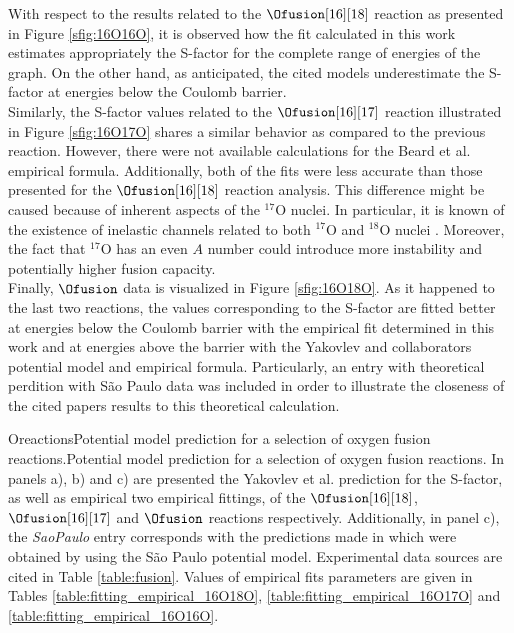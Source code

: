 \documentclass[openany]{book}
\begin{document}
With respect to the results related to the $\Ofusion[16][18]$ reaction as presented in Figure \ref{sfig:16O16O}, it is observed how the fit calculated in this work estimates appropriately the S-factor for the complete range of energies of the graph. On the other hand, as anticipated, the cited models underestimate the S-factor at energies below the Coulomb barrier. \\

Similarly, the S-factor values related to the $\Ofusion[16][17]$ reaction illustrated in Figure  \ref{sfig:16O17O} shares a similar behavior as compared to the previous reaction. However, there were not available calculations for the Beard et al. empirical formula. Additionally, both of the fits were less accurate than those presented for the $\Ofusion[16][18]$ reaction analysis. This difference might be caused because of inherent aspects of the $\mathrm{{}^{17}O}$ nuclei. In particular, it is known of the existence of inelastic channels related to both $\mathrm{{}^{17}O}$ and $\mathrm{{}^{18}O}$ nuclei \cite{kovar_geesaman_braid_eisen_henning_ophel_paul_rehm_sanders_sperr_et_1979}. Moreover, the fact that $\mathrm{{}^{17}O}$ has an even $A$ number could introduce more instability and potentially higher fusion capacity. \\

Finally,  $\Ofusion$ data is visualized in Figure \ref{sfig:16O18O}. As it happened to the last two reactions, the values corresponding to the S-factor are fitted better at energies below the Coulomb barrier with the empirical fit determined in this work and at energies above the barrier with the Yakovlev and collaborators potential model and empirical formula. Particularly, an entry with theoretical perdition with São Paulo data was included in order to illustrate the closeness of the cited papers results to this theoretical calculation. 


{Oreactions}{Potential model prediction for a selection of oxygen fusion reactions.}{Potential model prediction for a selection of oxygen fusion reactions. In panels a), b) and c) are presented the  Yakovlev et al. prediction for the S-factor, as well as empirical two empirical fittings,  of the $\Ofusion[16][18]$, $\Ofusion[16][17]$ and $\Ofusion$ reactions respectively. Additionally, in panel c), the \textit{SaoPaulo} entry corresponds with the predictions made in \cite{yakovlev_beard_gasques_wiescher_2010} which were obtained by using the São Paulo potential model. Experimental data sources are cited in Table \ref{table:fusion}. Values of empirical fits parameters are given in Tables \ref{table:fitting_empirical_16O18O}, \ref{table:fitting_empirical_16O17O} and \ref{table:fitting_empirical_16O16O}.}
\end{document}
